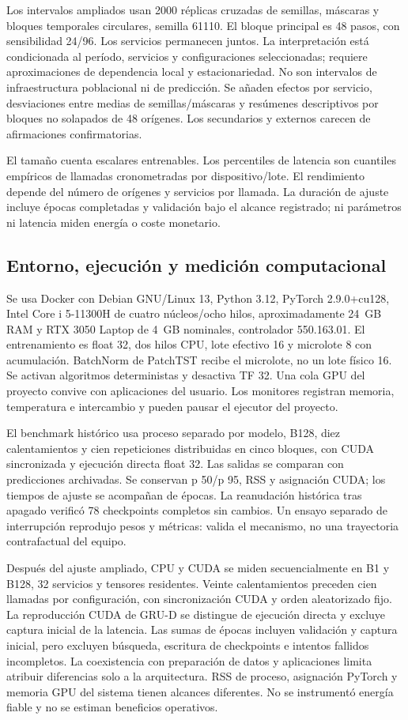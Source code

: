 Los intervalos ampliados usan 2000 réplicas cruzadas de semillas, máscaras y bloques temporales circulares, semilla 61110. El bloque principal es 48 pasos, con sensibilidad 24/96. Los servicios permanecen juntos. La interpretación está condicionada al período, servicios y configuraciones seleccionadas; requiere aproximaciones de dependencia local y estacionariedad. No son intervalos de infraestructura poblacional ni de predicción. Se añaden efectos por servicio, desviaciones entre medias de semillas/máscaras y resúmenes descriptivos por bloques no solapados de 48 orígenes. Los secundarios y externos carecen de afirmaciones confirmatorias.

El tamaño cuenta escalares entrenables. Los percentiles de latencia son cuantiles empíricos de llamadas cronometradas por dispositivo/lote. El rendimiento depende del número de orígenes y servicios por llamada. La duración de ajuste incluye épocas completadas y validación bajo el alcance registrado; ni parámetros ni latencia miden energía o coste monetario.

\subsection{Entorno, ejecución y medición computacional}
Se usa Docker con Debian GNU/Linux 13, Python 3.12, PyTorch 2.9.0+cu128, Intel Core i 5-11300H de cuatro núcleos/ocho hilos, aproximadamente 24~GB RAM y RTX 3050 Laptop de 4~GB nominales, controlador 550.163.01. El entrenamiento es float 32, dos hilos CPU, lote efectivo 16 y microlote 8 con acumulación. BatchNorm de PatchTST recibe el microlote, no un lote físico 16. Se activan algoritmos deterministas y desactiva TF 32. Una cola GPU del proyecto convive con aplicaciones del usuario. Los monitores registran memoria, temperatura e intercambio y pueden pausar el ejecutor del proyecto.

El benchmark histórico usa proceso separado por modelo, B128, diez calentamientos y cien repeticiones distribuidas en cinco bloques, con CUDA sincronizada y ejecución directa float 32. Las salidas se comparan con predicciones archivadas. Se conservan p 50/p 95, RSS y asignación CUDA; los tiempos de ajuste se acompañan de épocas. La reanudación histórica tras apagado verificó 78 checkpoints completos sin cambios. Un ensayo separado de interrupción reprodujo pesos y métricas: valida el mecanismo, no una trayectoria contrafactual del equipo.

Después del ajuste ampliado, CPU y CUDA se miden secuencialmente en B1 y B128, 32 servicios y tensores residentes. Veinte calentamientos preceden cien llamadas por configuración, con sincronización CUDA y orden aleatorizado fijo. La reproducción CUDA de GRU-D se distingue de ejecución directa y excluye captura inicial de la latencia. Las sumas de épocas incluyen validación y captura inicial, pero excluyen búsqueda, escritura de checkpoints e intentos fallidos incompletos. La coexistencia con preparación de datos y aplicaciones limita atribuir diferencias solo a la arquitectura. RSS de proceso, asignación PyTorch y memoria GPU del sistema tienen alcances diferentes. No se instrumentó energía fiable y no se estiman beneficios operativos.
